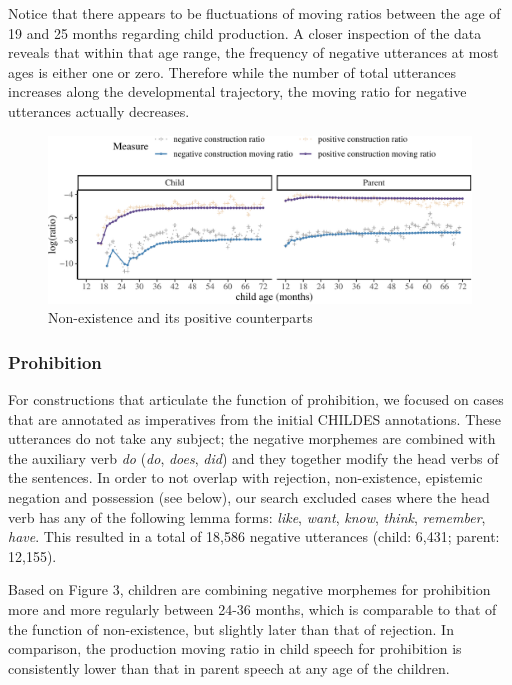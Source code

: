 \documentclass[
  english,
  man,floatsintext]{apa6}
\begin{document}
Notice that there appears to be fluctuations of moving ratios between the age of 19 and 25 months regarding child production. A closer inspection of the data reveals that within that age range, the frequency of negative utterances at most ages is either one or zero. Therefore while the number of total utterances increases along the developmental trajectory, the moving ratio for negative utterances actually decreases.

\begin{figure}[H]

{\centering \includegraphics{neg_construction_article_files/figure-latex/existence-1} 

}

\caption{Non-existence and its positive counterparts}\label{fig:existence}
\end{figure}

\hypertarget{prohibition}{%
\subsubsection{Prohibition}\label{prohibition}}

For constructions that articulate the function of prohibition, we focused on cases that are annotated as imperatives from the initial CHILDES annotations. These utterances do not take any subject; the negative morphemes are combined with the auxiliary verb \emph{do} (\emph{do}, \emph{does}, \emph{did}) and they together modify the head verbs of the sentences.
In order to not overlap with rejection, non-existence, epistemic negation and possession (see below), our search excluded cases where the head verb has any of the following lemma forms: \emph{like}, \emph{want}, \emph{know}, \emph{think}, \emph{remember}, \emph{have}. This resulted in a total of 18,586 negative utterances (child: 6,431; parent: 12,155).

Based on Figure 3, children are combining negative morphemes for prohibition more and more regularly between 24-36 months, which is comparable to that of the function of non-existence, but slightly later than that of rejection. In comparison, the production moving ratio in child speech for prohibition is consistently lower than that in parent speech at any age of the children.
\end{document}
